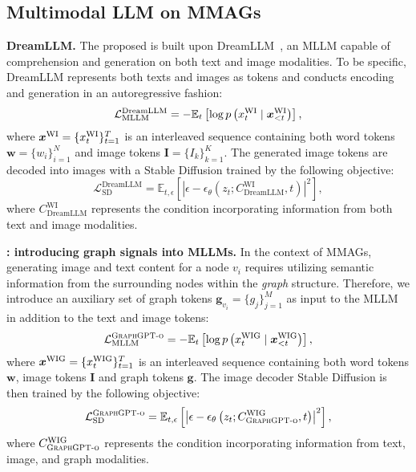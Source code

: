 \subsection{Multimodal LLM on MMAGs}\label{sec:graph-mllm}
\textbf{DreamLLM.} The proposed \Ours is built upon DreamLLM~\cite{dong2024dreamllmsynergisticmultimodalcomprehension}, an MLLM capable of comprehension and generation on both text and image modalities.
To be specific, DreamLLM represents both texts and images as tokens and conducts encoding and generation in an autoregressive fashion:
\begin{equation}
\mathcal{L}^{\text{DreamLLM}}_{\text{MLLM}} = -\mathbb{E}_{t} \left[ \log p\left(x^{\text{WI}}_t \mid {\bm x}^{\text{WI}}_{<t} \right) \right],
\end{equation}
where ${\bm x}^{\text{WI}}=\{x^{\text{WI}}_t\}^T_{t=1}$ is an interleaved sequence containing both word tokens $\bm{w}=\{ w_i\}^N_{i=1}$ and image tokens $\bm{I}=\{I_k\}^K_{k=1}$.
The generated image tokens are decoded into images with a Stable Diffusion \cite{rombach2022high} trained by the following objective:
\begin{equation}
\mathcal{L}^{\text{DreamLLM}}_{\text{SD}} = \mathbb{E}_{t, \epsilon}\left[ \left| \epsilon - \epsilon_{\theta}\left(z_t; C^{\text{WI}}_{\text{DreamLLM}}, t \right) \right|^2 \right],
\end{equation}
where $C^{\text{WI}}_{\text{DreamLLM}}$ represents the condition incorporating information from both text and image modalities.

\vspace{0.1in}
\noindent \textbf{\Ours: introducing graph signals into MLLMs.}
In the context of MMAGs, generating image and text content for a node $v_i$ requires utilizing semantic information from the surrounding nodes within the \textit{graph} structure.
Therefore, we introduce an auxiliary set of graph tokens $\bm{g}_{v_i}=\{ g_j\}^M_{j=1}$ as input to the MLLM in addition to the text and image tokens:
\begin{equation}
\mathcal{L}^{\text{\textsc{GraphGPT-o}}}_{\text{MLLM}} = -\mathbb{E}_{t} \left[ \log p\left(x^{\text{WIG}}_t \mid {\bm x}^{\text{WIG}}_{<t} \right) \right],
\end{equation}
where ${\bm x}^{\text{WIG}}=\{x^{\text{WIG}}_t\}^T_{t=1}$ is an interleaved sequence containing both word tokens $\bm{w}$, image tokens $\bm{I}$ and graph tokens $\bm{g}$.
The image decoder Stable Diffusion \cite{rombach2022high} is then trained by the following objective:
\begin{equation}
\mathcal{L}^{\text{\textsc{GraphGPT-o}}}_{\text{SD}} = \mathbb{E}_{t, \epsilon}\left[ \left| \epsilon - \epsilon_{\theta}\left(z_t; C^{\text{WIG}}_{\text{\textsc{GraphGPT-o}}}, t \right) \right|^2 \right],
\end{equation}
where $C^{\text{WIG}}_{\text{\textsc{GraphGPT-o}}}$ represents the condition incorporating information from text, image, and graph modalities.

